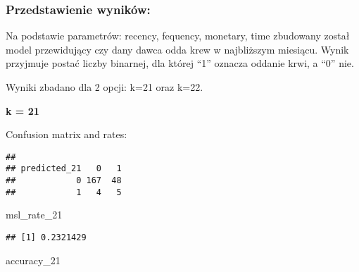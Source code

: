 \documentclass[]{article}
\newenvironment{Shaded}{\begin{snugshade}}{\end{snugshade}}
\newcommand{\KeywordTok}[1]{\textcolor[rgb]{0.13,0.29,0.53}{\textbf{#1}}}
\newcommand{\DecValTok}[1]{\textcolor[rgb]{0.00,0.00,0.81}{#1}}
\newcommand{\StringTok}[1]{\textcolor[rgb]{0.31,0.60,0.02}{#1}}
\newcommand{\OperatorTok}[1]{\textcolor[rgb]{0.81,0.36,0.00}{\textbf{#1}}}
\newcommand{\NormalTok}[1]{#1}
\begin{document}
\subsubsection{Przedstawienie wyników: }\label{przedstawienie-wynikow}

Na podstawie parametrów: recency, fequency, monetary, time zbudowany
został model przewidujący czy dany dawca odda krew w najbliższym
miesiącu. Wynik przyjmuje postać liczby binarnej, dla której ``1''
oznacza oddanie krwi, a ``0'' nie.

Wyniki zbadano dla 2 opcji: k=21 oraz k=22.

\textbf{k = 21}

Confusion matrix and rates:

\begin{Shaded}
\end{Shaded}

\begin{verbatim}
##             
## predicted_21   0   1
##            0 167  48
##            1   4   5
\end{verbatim}

\begin{Shaded}
\begin{Highlighting}[]
\NormalTok{msl_rate_}\DecValTok{21}
\end{Highlighting}
\end{Shaded}

\begin{verbatim}
## [1] 0.2321429
\end{verbatim}

\begin{Shaded}
\begin{Highlighting}[]
\NormalTok{accuracy_}\DecValTok{21}
\end{Highlighting}
\end{Shaded}
\end{document}
